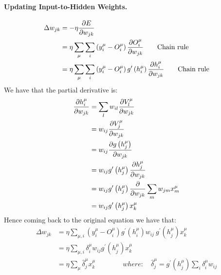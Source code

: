 \paragraph*{Updating Input-to-Hidden Weights.}
\begin{equation} \notag
\begin{split}
\Delta w _ { j k } &= - \eta \frac { \partial E } { \partial w _ { j k } } \\
&= \eta \sum _ { \mu } \sum _ { i } \left( y _ { i } ^ { \mu } - O _ { i } ^ { \mu } \right) \frac { \partial O _ { i } ^ { \mu } } { \partial w _ { j k } } \qquad \text{Chain rule}\\
&= \eta \sum _ { \mu } \sum _ { i } \left( y _ { i } ^ { \mu } - O _ { i } ^ { \mu } \right) g ^ { \prime } \left( h _ { i } ^ { \mu } \right) \frac { \partial h _ { i } ^ { \mu } } { \partial w _ { j k } } \qquad \text{Chain rule}
\end{split}
\end{equation}
We have that the partial derivative is:
\begin{equation} \notag
\begin{split}
\frac { \partial h _ { i } ^ { \mu } } { \partial w _ { j k } } &= \sum _ { l } w_{ i l } \frac { \partial V _ { l } ^ { \mu } } { \partial w_{ j k } }\\
&= w_ { i j } \frac { \partial  V_ { j } ^ { \mu } } { \partial  w _ { j k } }\\
&= w_{ i j } \frac { \partial g \left( h _ { j } ^ { \mu } \right) } { \partial w _ { j k } }\\
&= w_{ i j } g ^ { \prime } \left( h _ { j } ^ { \mu } \right) \frac { \partial h _ { j } ^ { \mu } } { \partial w _ { j k } }\\
&= w_{ i j } g ^ { \prime } \left( h _ { j } ^ { \mu } \right) \frac { \partial } { \partial w _ { j k } } \sum _ { m } w _ { j m } x _ { m } ^ { \mu }\\
&=  w_{ i j } g ^ { \prime } \left( h _ { j } ^ { \mu } \right) x _ { k } ^ { \mu }
\end{split}
\end{equation}
Hence coming back to the original equation we have that:
\begin{equation}
\begin{split}
\Delta w _ { j k } &= \eta \sum _ { \mu , i } \left( y _ { i } ^ { \mu } - O _ { i } ^ { \mu } \right) g ^ { \prime } \left( h _ { i } ^ { \mu } \right) w_ { i j } ~g ^ { \prime } \left( h _ { j } ^ { \mu } \right) x _ { k } ^ { \mu }\\
&= \eta \sum _ { \mu , i } \delta _ { i } ^ { \mu } w_ { i j } g ^ { \prime } \left( h _ { j } ^ { \mu } \right) x _ { k } ^ { \mu }\\
&= \eta \sum _ { \mu } \hat { \delta } _ { j } ^ { \mu } x _ { k } ^ { \mu } \qquad \qquad where: \quad \hat { \delta } _ { j } ^ { \mu } = g ^ { \prime } \left( h _ { j } ^ { \mu } \right) \sum _ { i } \delta _ { i } ^ { \mu } w_ { i j }
\end{split}
\end{equation}
